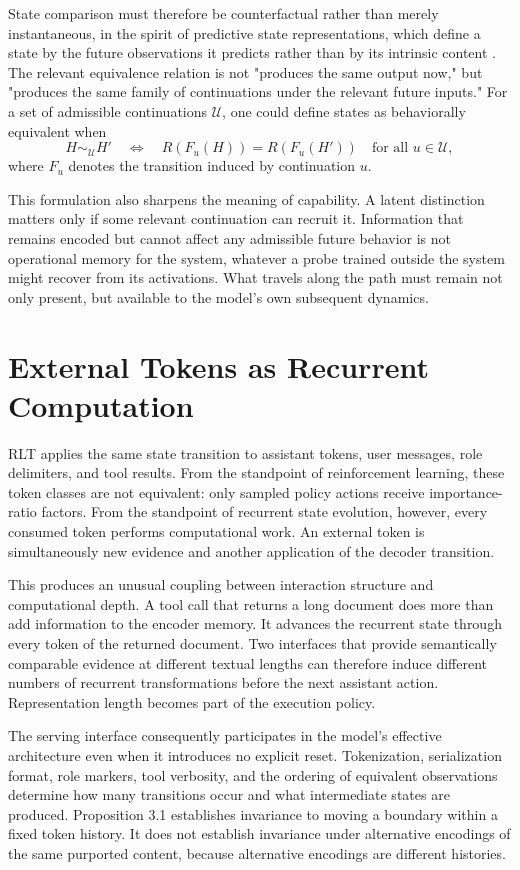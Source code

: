 \documentclass[11pt]{article}
\begin{document}
State comparison must therefore be counterfactual rather than merely instantaneous, in the spirit of predictive state representations, which define a state by the future observations it predicts rather than by its intrinsic content \cite{littman2001predictive}. The relevant equivalence relation is not "produces the same output now," but "produces the same family of continuations under the relevant future inputs." For a set of admissible continuations $\mathcal{U}$, one could define states as behaviorally equivalent when
\[
H \sim_{\mathcal{U}} H'
\quad\Longleftrightarrow\quad
R(F_u(H)) = R(F_u(H'))
\quad\text{for all } u \in \mathcal{U},
\]
where $F_u$ denotes the transition induced by continuation $u$.

This formulation also sharpens the meaning of capability. A latent distinction matters only if some relevant continuation can recruit it. Information that remains encoded but cannot affect any admissible future behavior is not operational memory for the system, whatever a probe trained outside the system might recover from its activations. What travels along the path must remain not only present, but available to the model's own subsequent dynamics.

\section{External Tokens as Recurrent Computation}

RLT applies the same state transition to assistant tokens, user messages, role delimiters, and tool results. From the standpoint of reinforcement learning, these token classes are not equivalent: only sampled policy actions receive importance-ratio factors. From the standpoint of recurrent state evolution, however, every consumed token performs computational work. An external token is simultaneously new evidence and another application of the decoder transition.

This produces an unusual coupling between interaction structure and computational depth. A tool call that returns a long document does more than add information to the encoder memory. It advances the recurrent state through every token of the returned document. Two interfaces that provide semantically comparable evidence at different textual lengths can therefore induce different numbers of recurrent transformations before the next assistant action. Representation length becomes part of the execution policy.

The serving interface consequently participates in the model's effective architecture even when it introduces no explicit reset. Tokenization, serialization format, role markers, tool verbosity, and the ordering of equivalent observations determine how many transitions occur and what intermediate states are produced. Proposition 3.1 establishes invariance to moving a boundary within a fixed token history. It does not establish invariance under alternative encodings of the same purported content, because alternative encodings are different histories.
\end{document}
